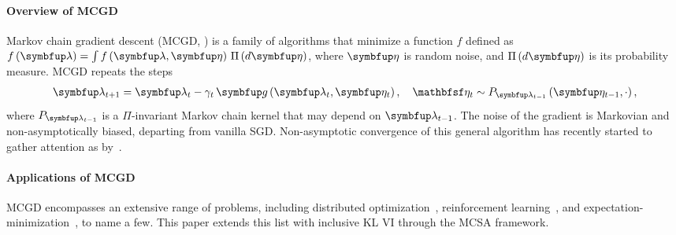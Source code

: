 \paragraph{\textbf{Overview of MCGD}}
Markov chain gradient descent (MCGD, \citealt{duchi_ergodic_2012, NEURIPS2018_1371bcce}) is a family of algorithms that minimize a function \(f\) defined as \(f\left(\vlambda\right) = \int f\left(\vlambda, \veta\right) \, \Pi\left(d\veta\right)\), where \(\veta\) is random noise, and \(\Pi\left(d\veta\right)\) is its probability measure.
MCGD repeats the steps 
{%
\begin{align}
  \vlambda_{t+1}    = \vlambda_{t} - \gamma_t \, \vg\left(\vlambda_t, \veta_{t}\right),\quad 
  \rvveta_{t}  \sim P_{\vlambda_{t-1}}\left( \veta_{t-1}, \cdot \right),\label{eq:mcgd}
\end{align}
}%
where \(P_{\vlambda_{t-1}}\) is a \(\Pi\)-invariant Markov chain kernel that may depend on \(\vlambda_{t-1}\).
The noise of the gradient is Markovian and non-asymptotically biased, departing from vanilla SGD.
Non-asymptotic convergence of this general algorithm has recently started to gather attention as by~\citet{duchi_ergodic_2012, NEURIPS2018_1371bcce, pmlr-v99-karimi19a, doan_finitetime_2020, doan_convergence_2020, debavelaere_convergence_2021}.

\vspace{-1.5ex}
\paragraph{\textbf{Applications of MCGD}}
MCGD encompasses an extensive range of problems, including distributed optimization~\citep{ram_incremental_2009}, reinforcement learning~\citep{tadic_asymptotic_2017, doan_convergence_2020, Xiong_Xu_Liang_Zhang_2021}, and expectation-minimization~\citep{pmlr-v99-karimi19a}, to name a few.
This paper extends this list with inclusive KL VI through the MCSA framework.


